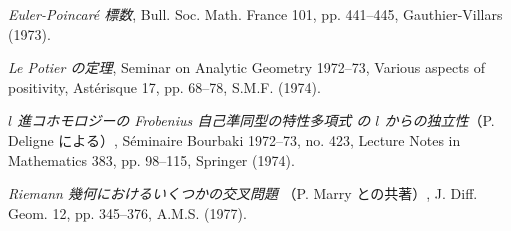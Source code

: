\begin{description}
\item[{[20]}] \emph{Euler-Poincaré 標数}, Bull. Soc. Math. France 101,
pp. 441--445, Gauthier-Villars (1973).

\item[{[21]}] \emph{Le Potier の定理}, Seminar on Analytic Geometry
1972--73, Various aspects of positivity, Astérisque 17, pp. 68--78,
S.M.F. (1974).

\item[{[22]}] \emph{$l$ 進コホモロジーの Frobenius 自己準同型の特性多項式
の $l$ からの独立性}（P. Deligne による）, Séminaire Bourbaki
1972--73, no. 423, Lecture Notes in Mathematics 383, pp. 98--115,
Springer (1974).

\item[{[23]}] \emph{Riemann 幾何におけるいくつかの交叉問題}
（P. Marry との共著）, J. Diff. Geom. 12, pp. 345--376, A.M.S. (1977).
\end{description}
\normalsize
